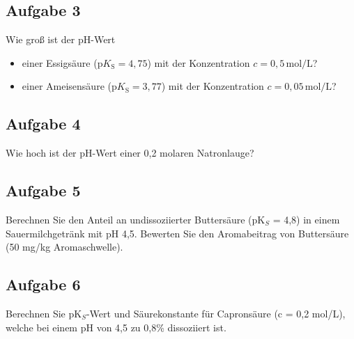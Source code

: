 \documentclass[a4paper,11pt]{article}
\newif\ifshowme
\begin{document}
\subsection*{Aufgabe 3}
Wie groß ist der pH-Wert 
\begin{itemize}
\item einer Essigsäure ($\text{p}K_\text{S} = 4{,}75$) mit der Konzentration $c = 0{,}5\,\text{mol/L}$?
\item einer Ameisensäure ($\text{p}K_\text{S} = 3{,}77$) mit der Konzentration $c = 0{,}05\,\text{mol/L}$?
\end{itemize}
\ifshowme
\antwort{
\begin{equation*}
    \text{pH} = 0{,}5 \cdot (4{,}75 - \lg(0{,}5)) = 2{,}53
\end{equation*}

Der pH-Wert einer $0{,}5$ molaren Essigsäure beträgt $2{,}53$.
}
\else
\fi

\subsection*{Aufgabe 4}
Wie hoch ist der pH-Wert einer 0,2 molaren Natronlauge?



\subsection*{Aufgabe 5}
Berechnen Sie den Anteil an undissoziierter Buttersäure (pK$_S$ = 4,8) in einem Sauermilchgetränk mit pH 4,5. Bewerten Sie den Aromabeitrag von Buttersäure (50 mg/kg Aromaschwelle).

\subsection*{Aufgabe 6}
Berechnen Sie pK$_S$-Wert und Säurekonstante für Capronsäure (c = 0,2 mol/L), welche bei einem pH von 4,5 zu 0,8\% dissoziiert ist.
\end{document}
